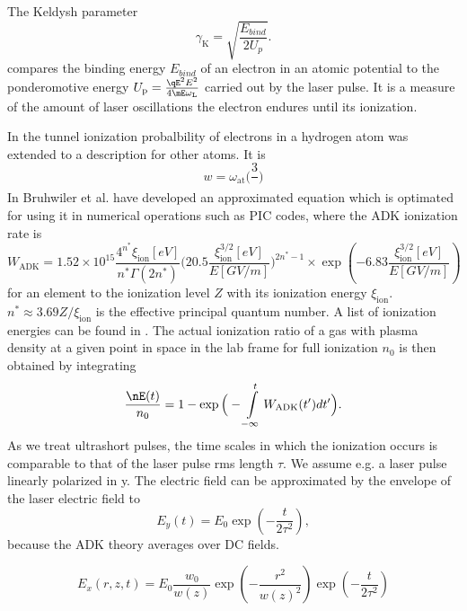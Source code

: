 The Keldysh parameter 
\begin{equation}
\gamma_\mathrm{K}=\sqrt{\frac{E_{bind}}{2U_p}}.
\end{equation}
compares the binding energy $E_{bind}$ of an electron in an atomic potential to the ponderomotive energy
 $U_\mathrm{p}=\frac{\qE^2 E^2}{4\mE \omega_\mathrm{L}}$ carried out by the laser pulse. 
 It is a measure of the amount of laser oscillations the electron endures until its ionization.
 
 


In \cite{ADK_original} the tunnel ionization probalbility of electrons in a hydrogen atom was extended to a description for other atoms. It is 
\begin{equation}
w=\omega_\mathrm{at}\Big(\frac{3}{} \Big)
\end{equation}
In \cite{bruhwiler2003PoP} Bruhwiler et al. have developed an approximated equation which is optimated for using it in numerical operations such as PIC codes, where the ADK ionization rate is 
\begin{equation}
W_\mathrm{ADK}=1.52\times 10^{15}\frac{4^{n^*}\xi_\mathrm{ion}[eV]}{n^*\Gamma(2n^*)}\Big(20.5\frac{\xi_\mathrm{ion}^{3/2}[eV]}{E[GV/m]}\Big)^{2n^*-1}\times \exp(-6.83\frac{\xi_\mathrm{ion}^{3/2}[eV]}{E[GV/m]})
\label{eqn:ADK_Bruhwiler}
\end{equation}
for an element to the ionization level $Z$ with its ionization energy $\xi_\mathrm{ion}$.
$n^*\approx 3.69Z/\xi_\mathrm{ion}$ is the effective principal quantum number.
A list of ionization energies can be found in \cite{Kelly_1982_Ion_Energies}.
The actual ionization ratio of a gas with plasma density at a given point in space in the lab frame for full ionization $n_0$ is then obtained by integrating 
\begin{equation}
\frac{\nE(t)}{n_0} =1-\exp\Big(-\int \limits_{-\infty}^t W_\mathrm{ADK}(t')dt'\Big).
\end{equation}
As we treat ultrashort pulses, the time scales in which the ionization occurs is comparable to that of the laser pulse rms length $\tau$. We assume e.g. a laser pulse linearly polarized in y. 
The electric field can be approximated by the envelope of the laser electric field to 
\begin{equation}
E_{y}(t)=E_0\exp(-\frac{t}{2\tau^2}),
\end{equation}
because the ADK theory averages over DC fields.

\begin{equation}
E_{x}(r,z,t)=E_0\frac{w_0}{w(z)}\exp(-\frac{r^2}{w(z)^2})\exp(-\frac{t}{2\tau^2})
\end{equation}

